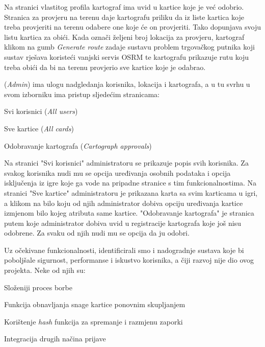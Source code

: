 		Na stranici vlastitog profila kartograf ima uvid u kartice koje je već odobrio. Stranica za provjeru na terenu daje kartografu priliku da iz liste kartica koje treba provjeriti na terenu odabere one koje će on provjeriti. Tako dopunjava svoju listu kartica za obići. Kada označi željeni broj lokacija za provjeru, kartograf klikom na gumb \textit{Generate route} zadaje sustavu problem trgovačkog putnika koji sustav rješava koristeći vanjski servis OSRM te kartografu prikazuje rutu koju treba obići da bi na terenu provjerio sve kartice koje je odabrao.
		
		 (\textit{Admin}) ima ulogu nadgledanja korisnika, lokacija i kartografa, a u tu svrhu u svom izborniku ima pristup sljedećim stranicama:
		
		\begin{packed_item}
		    \item Svi korisnici (\textit{All users})
		    \item Sve kartice (\textit{All cards})
		    \item Odobravanje kartografa (\textit{Cartograph approvals})
		\end{packed_item}
		
		Na stranici "Svi korisnici" administratoru se prikazuje popis svih korisnika. Za svakog korisnika nudi mu se opcija uređivanja osobnih podataka i opcija isključenja iz igre koje ga vode na pripadne stranice s tim funkcionalnostima. Na stranici "Sve kartice" administratoru je prikazana karta sa svim karticama u igri, a klikom na bilo koju od njih administrator dobiva opciju uređivanja kartice izmjenom bilo kojeg atributa same kartice. "Odobravanje kartografa" je stranica putem koje administrator dobiva uvid u registracije kartografa koje još nisu odobrene. Za svaku od njih nudi mu se opcija da ju odobri.
		
		Uz očekivane funkcionalnosti, identificirali smo i nadogradnje sustava koje bi poboljšale sigurnost, performanse i iskustvo korisnika, a čiji razvoj nije dio ovog projekta. Neke od njih su:
		
		\begin{packed_item}
		    \item Složeniji proces borbe
		    \item Funkcija obnavljanja snage kartice ponovnim skupljanjem
		    \item Korištenje \textit{hash} funkcija za spremanje i razmjenu zaporki
		    \item Integracija drugih načina prijave
		    
		\end{packed_item}
		
